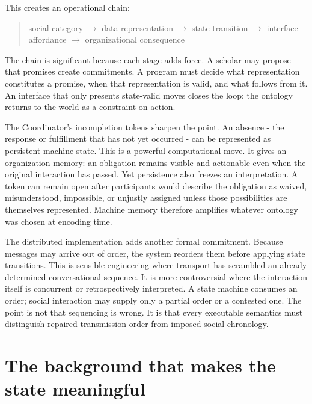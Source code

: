 \documentclass[11pt]{article}
\begin{document}
This creates an operational chain:\par

\begin{quote}social category $\rightarrow$ data representation $\rightarrow$ state transition $\rightarrow$ interface affordance $\rightarrow$ organizational consequence\end{quote}

The chain is significant because each stage adds force. A scholar may propose that promises create commitments. A program must decide what representation constitutes a promise, when that representation is valid, and what follows from it. An interface that only presents state-valid moves closes the loop: the ontology returns to the world as a constraint on action.\par

The Coordinator's incompletion tokens sharpen the point. An absence - the response or fulfillment that has not yet occurred - can be represented as persistent machine state. This is a powerful computational move. It gives an organization memory: an obligation remains visible and actionable even when the original interaction has passed. Yet persistence also freezes an interpretation. A token can remain open after participants would describe the obligation as waived, misunderstood, impossible, or unjustly assigned unless those possibilities are themselves represented. Machine memory therefore amplifies whatever ontology was chosen at encoding time. \cite{flores1993conversation}\par

The distributed implementation adds another formal commitment. Because messages may arrive out of order, the system reorders them before applying state transitions. This is sensible engineering where transport has scrambled an already determined conversational sequence. It is more controversial where the interaction itself is concurrent or retrospectively interpreted. A state machine consumes an order; social interaction may supply only a partial order or a contested one. The point is not that sequencing is wrong. It is that every executable semantics must distinguish repaired transmission order from imposed social chronology.\par

\section{The background that makes the state meaningful}
\end{document}
